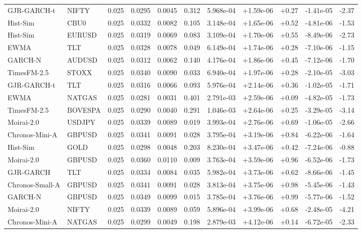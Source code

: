 \begin{tabular}{llrrrrrrrrr}
GJR-GARCH-t & NIFTY & 0.025 & 0.0295 & 0.0045 & 0.312 & 5.968e-04 & +1.59e-06 & +0.27 & -1.41e-05 & -2.37 \\
Hist-Sim & CBU0 & 0.025 & 0.0332 & 0.0082 & 0.105 & 3.148e-04 & +1.65e-06 & +0.52 & -4.81e-06 & -1.53 \\
Hist-Sim & EURUSD & 0.025 & 0.0319 & 0.0069 & 0.083 & 3.109e-04 & +1.70e-06 & +0.55 & -8.49e-06 & -2.73 \\
EWMA & TLT & 0.025 & 0.0328 & 0.0078 & 0.049 & 6.149e-04 & +1.74e-06 & +0.28 & -7.10e-06 & -1.15 \\
GARCH-N & AUDUSD & 0.025 & 0.0312 & 0.0062 & 0.140 & 4.176e-04 & +1.86e-06 & +0.45 & -7.12e-06 & -1.70 \\
TimesFM-2.5 & STOXX & 0.025 & 0.0340 & 0.0090 & 0.033 & 6.940e-04 & +1.97e-06 & +0.28 & -2.10e-05 & -3.03 \\
GJR-GARCH-t & TLT & 0.025 & 0.0316 & 0.0066 & 0.093 & 5.976e-04 & +2.14e-06 & +0.36 & -1.02e-05 & -1.71 \\
EWMA & NATGAS & 0.025 & 0.0281 & 0.0031 & 0.401 & 2.791e-03 & +2.59e-06 & +0.09 & -4.82e-05 & -1.73 \\
TimesFM-2.5 & BOVESPA & 0.025 & 0.0290 & 0.0040 & 0.291 & 1.046e-03 & +2.64e-06 & +0.25 & -3.29e-05 & -3.14 \\
Moirai-2.0 & USDJPY & 0.025 & 0.0339 & 0.0089 & 0.019 & 3.993e-04 & +2.76e-06 & +0.69 & -1.06e-05 & -2.66 \\
Chronos-Mini-A & GBPUSD & 0.025 & 0.0341 & 0.0091 & 0.028 & 3.795e-04 & +3.19e-06 & +0.84 & -6.22e-06 & -1.64 \\
Hist-Sim & GOLD & 0.025 & 0.0298 & 0.0048 & 0.203 & 8.230e-04 & +3.47e-06 & +0.42 & -7.24e-06 & -0.88 \\
Moirai-2.0 & GBPUSD & 0.025 & 0.0360 & 0.0110 & 0.009 & 3.763e-04 & +3.59e-06 & +0.96 & -6.52e-06 & -1.73 \\
GJR-GARCH & TLT & 0.025 & 0.0334 & 0.0084 & 0.035 & 5.982e-04 & +3.73e-06 & +0.62 & -8.66e-06 & -1.45 \\
Chronos-Small-A & GBPUSD & 0.025 & 0.0341 & 0.0091 & 0.028 & 3.813e-04 & +3.75e-06 & +0.98 & -5.45e-06 & -1.43 \\
GARCH-N & GBPUSD & 0.025 & 0.0349 & 0.0099 & 0.015 & 3.785e-04 & +3.76e-06 & +0.99 & -5.77e-06 & -1.52 \\
Moirai-2.0 & NIFTY & 0.025 & 0.0339 & 0.0089 & 0.059 & 5.896e-04 & +3.99e-06 & +0.68 & -2.48e-05 & -4.21 \\
Chronos-Mini-A & NATGAS & 0.025 & 0.0299 & 0.0049 & 0.198 & 2.879e-03 & +4.12e-06 & +0.14 & -6.72e-05 & -2.33 \\

\end{tabular}
